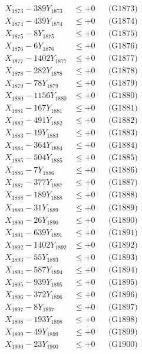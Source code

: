 \documentclass[a4paper,10pt]{article}
\begin{document}
{\begin{align}
X_{1873} - 389Y_{1873} &\leq +0 && \text{(G1873)} \\
X_{1874} - 439Y_{1874} &\leq +0 && \text{(G1874)} \\
X_{1875} - 8Y_{1875} &\leq +0 && \text{(G1875)} \\
X_{1876} - 6Y_{1876} &\leq +0 && \text{(G1876)} \\
X_{1877} - 1402Y_{1877} &\leq +0 && \text{(G1877)} \\
X_{1878} - 282Y_{1878} &\leq +0 && \text{(G1878)} \\
X_{1879} - 78Y_{1879} &\leq +0 && \text{(G1879)} \\
X_{1880} - 1156Y_{1880} &\leq +0 && \text{(G1880)} \\
\allowbreak
X_{1881} - 167Y_{1881} &\leq +0 && \text{(G1881)} \\
X_{1882} - 491Y_{1882} &\leq +0 && \text{(G1882)} \\
X_{1883} - 19Y_{1883} &\leq +0 && \text{(G1883)} \\
X_{1884} - 364Y_{1884} &\leq +0 && \text{(G1884)} \\
X_{1885} - 504Y_{1885} &\leq +0 && \text{(G1885)} \\
X_{1886} - 7Y_{1886} &\leq +0 && \text{(G1886)} \\
X_{1887} - 377Y_{1887} &\leq +0 && \text{(G1887)} \\
X_{1888} - 189Y_{1888} &\leq +0 && \text{(G1888)} \\
X_{1889} - 31Y_{1889} &\leq +0 && \text{(G1889)} \\
X_{1890} - 26Y_{1890} &\leq +0 && \text{(G1890)} \\
\allowbreak
X_{1891} - 639Y_{1891} &\leq +0 && \text{(G1891)} \\
X_{1892} - 1402Y_{1892} &\leq +0 && \text{(G1892)} \\
X_{1893} - 55Y_{1893} &\leq +0 && \text{(G1893)} \\
X_{1894} - 587Y_{1894} &\leq +0 && \text{(G1894)} \\
X_{1895} - 939Y_{1895} &\leq +0 && \text{(G1895)} \\
X_{1896} - 372Y_{1896} &\leq +0 && \text{(G1896)} \\
X_{1897} - 8Y_{1897} &\leq +0 && \text{(G1897)} \\
X_{1898} - 193Y_{1898} &\leq +0 && \text{(G1898)} \\
X_{1899} - 49Y_{1899} &\leq +0 && \text{(G1899)} \\
X_{1900} - 23Y_{1900} &\leq +0 && \text{(G1900)} \\

\end{align}}
\end{document}
